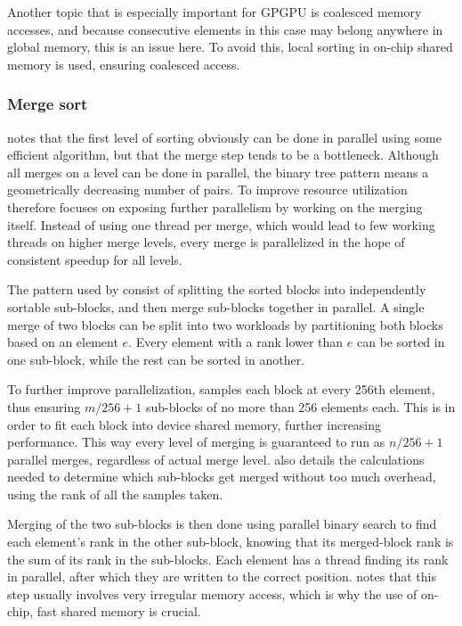 \documentclass[twocolumn]{article} %
\begin{document}
			Another topic that is especially important for GPGPU is coalesced memory accesses, and because consecutive elements
			in this case may belong anywhere in global memory, this is an issue here. To avoid this, local sorting in on-chip
			shared memory is used, ensuring coalesced access.
		
		\subsubsection*{Merge sort}
			\cite{satish09} notes that the first level of sorting obviously can be done in parallel using some efficient algorithm, but
			that the merge step tends to be a bottleneck. Although all merges on a level can be done in parallel, the binary tree
			pattern means a geometrically decreasing number of pairs. To improve resource utilization\cite{satish09} therefore focuses on
			exposing further parallelism by working on the merging itself. Instead of using one thread per merge, which would
			lead to few working threads on higher merge levels, every merge is parallelized in the hope of consistent speedup
			for all levels.
			
			The pattern used by \cite{satish09} consist of splitting the sorted blocks into independently sortable sub-blocks, and then
			merge sub-blocks together in parallel. A single merge of two blocks can be split into two workloads by partitioning
			both blocks based on an element $e$. Every element with a rank lower than $e$ can be sorted in one sub-block, while
			the rest can be sorted in another.
			
			To further improve parallelization, \cite{satish09} samples each block at every 256th element, thus ensuring $m/256 + 1$ 
			sub-blocks of no more than 256 elements each. This is in order to fit each block into device shared memory, further
			increasing performance. This way every level of merging is guaranteed to run as $n/256 +1$ parallel merges,
			regardless of actual merge level. \cite{satish09} also details the calculations needed to determine which sub-blocks get
			merged without too much overhead, using the rank of all the samples taken.
			
			Merging of the two sub-blocks is then done using parallel binary search to find each element's rank in the other
			sub-block, knowing that its merged-block rank is the sum of its rank in the sub-blocks. Each element has a thread
			finding its rank in parallel, after which they are written to the correct position. \cite{satish09} notes that this step
			usually involves very irregular memory access, which is why the use of on-chip, fast shared memory is crucial.
						
\end{document}
